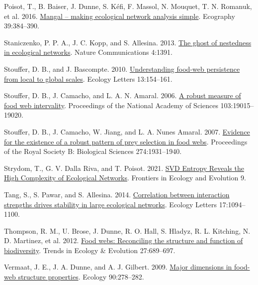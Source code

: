 \documentclass[
]{article}
\newlength{\cslhangindent}
\newenvironment{CSLReferences}[2] %
 {\begin{list}{}{%
  \setlength{\itemindent}{0pt}
  \setlength{\leftmargin}{0pt}
  \setlength{\parsep}{0pt}
  \ifodd #1
   \setlength{\leftmargin}{\cslhangindent}
   \setlength{\itemindent}{-1\cslhangindent}
  \fi
  \setlength{\itemsep}{#2\baselineskip}}}
 {\end{list}}
\begin{document}
\begin{CSLReferences}{0}{0}
Poisot, T., B. Baiser, J. Dunne, S. Kéfi, F. Massol, N. Mouquet, T. N.
Romanuk, et al. 2016. \href{https://doi.org/10.1111/ecog.00976}{Mangal
-- making ecological network analysis simple}. Ecography 39:384--390.

Staniczenko, P. P. A., J. C. Kopp, and S. Allesina. 2013.
\href{https://doi.org/10.1038/ncomms2422}{The ghost of nestedness in
ecological networks}. Nature Communications 4:1391.

Stouffer, D. B., and J. Bascompte. 2010.
\href{https://doi.org/10.1111/j.1461-0248.2009.01407.x}{Understanding
food-web persistence from local to global scales}. Ecology Letters
13:154--161.

Stouffer, D. B., J. Camacho, and L. A. N. Amaral. 2006.
\href{https://doi.org/10.1073/pnas.0603844103}{A robust measure of food
web intervality}. Proceedings of the National Academy of Sciences
103:19015--19020.

Stouffer, D. B., J. Camacho, W. Jiang, and L. A. Nunes Amaral. 2007.
\href{https://doi.org/10.1098/rspb.2007.0571}{Evidence for the existence
of a robust pattern of prey selection in food webs}. Proceedings of the
Royal Society B: Biological Sciences 274:1931--1940.

Strydom, T., G. V. Dalla Riva, and T. Poisot. 2021.
\href{https://doi.org/10.3389/fevo.2021.623141}{{SVD Entropy Reveals}
the {High Complexity} of {Ecological Networks}}. Frontiers in Ecology
and Evolution 9.

Tang, S., S. Pawar, and S. Allesina. 2014.
\href{https://doi.org/10.1111/ele.12312}{Correlation between interaction
strengths drives stability in large ecological networks}. Ecology
Letters 17:1094--1100.

Thompson, R. M., U. Brose, J. Dunne, R. O. Hall, S. Hladyz, R. L.
Kitching, N. D. Martinez, et al. 2012.
\href{https://doi.org/10.1016/j.tree.2012.08.005}{Food webs: Reconciling
the structure and function of biodiversity}. Trends in Ecology \&
Evolution 27:689--697.

Vermaat, J. E., J. A. Dunne, and A. J. Gilbert. 2009.
\href{https://doi.org/10.1890/07-0978.1}{Major dimensions in food-web
structure properties}. Ecology 90:278--282.


\end{CSLReferences}
\end{document}
